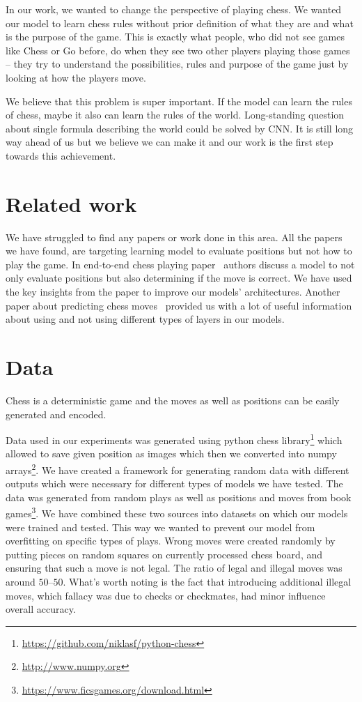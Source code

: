 \documentclass[10pt,twocolumn,letterpaper]{article}
\begin{document}
In our work, we wanted to change the perspective of playing chess. We wanted our
model to learn chess rules without prior definition of what they are and what is
the purpose of the game. This is exactly what people, who did not see games like
Chess or Go before, do when they see two other players playing those games --
they try to understand the possibilities, rules and purpose of the game just by
looking at how the players move.

We believe that this problem is super important. If the model can learn the
rules of chess, maybe it also can learn the rules of the world. Long-standing
question about single formula describing the world could be solved by CNN. It is
still long way ahead of us but we believe we can make it and our work is the
first step towards this achievement.

\section{Related work}

We have struggled to find any papers or work done in this area. All the papers
we have found, are targeting learning model to evaluate positions but not how to
play the game. In end-to-end chess playing paper~\cite{DeepChess} authors
discuss a model to not only evaluate positions but also determining if the move
is correct. We have used the key insights from the paper to improve our models'
architectures. Another paper about predicting chess
moves~\cite{Oshri2015PredictingMI} provided us with a lot of useful information
about using and not using different types of layers in our models.

\section{Data}

Chess is a deterministic game and the moves as well as positions can be easily
generated and encoded.

Data used in our experiments was generated using python chess
library\footnote{\url{https://github.com/niklasf/python-chess}} which allowed to
save given position as images which then we converted into numpy
arrays\footnote{\url{http://www.numpy.org}}. We have created a framework for
generating random data with different outputs which were necessary for different
types of models we have tested. The data was generated from random plays as well
as positions and moves from book
games\footnote{\url{https://www.ficsgames.org/download.html}}. We have combined
these two sources into datasets on which our models were trained and tested.
This way we wanted to prevent our model from overfitting on specific types of
plays. Wrong moves were created randomly by putting pieces on random squares on
currently processed chess board, and ensuring that such a move is not legal. The
ratio of legal and illegal moves was around $50$--$50$. What's worth noting is
the fact that introducing additional illegal moves, which fallacy was due to
checks or checkmates, had minor influence overall accuracy.
\end{document}
